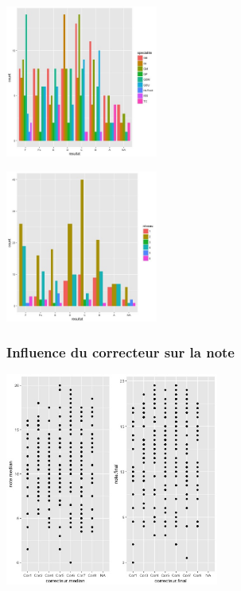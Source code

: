 \documentclass[]{report}
\begin{document}
	\begin{center}
	\includegraphics[width=50mm]{Figures/Notes/specialite_resultat.jpg}
	\label{fig:specialite_resultat}
	\end{center}


		\begin{center}
		\includegraphics[width=50mm]{Figures/Notes/niveau_resultat.jpg}
		\label{fig:niveau_resultat}
		\end{center}

\subsubsection{Influence du correcteur sur la note}

	\begin{center}
	\includegraphics[width=70mm]{Figures/Notes/correcteur.jpg}
	\label{fig:scatter_correcteur_median}
\end{center}
\end{document}
